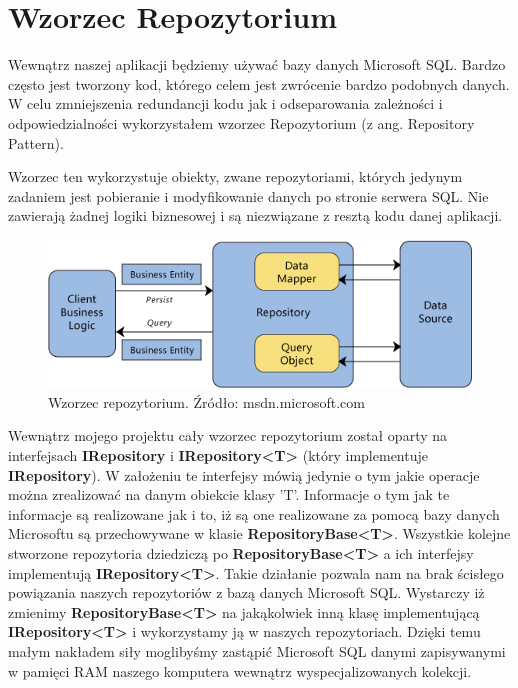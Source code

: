 \section{Wzorzec Repozytorium\cite{RepositoryUnitOfWorkPattern}}

Wewnątrz naszej aplikacji będziemy używać bazy danych Microsoft SQL. Bardzo często jest tworzony kod, którego celem jest zwrócenie bardzo podobnych danych. W celu zmniejszenia redundancji kodu jak i odseparowania zależności i odpowiedzialności wykorzystałem wzorzec Repozytorium (z ang. Repository Pattern).

Wzorzec ten wykorzystuje obiekty, zwane repozytoriami, których jedynym zadaniem jest pobieranie i modyfikowanie danych po stronie serwera SQL. Nie zawierają żadnej logiki biznesowej i są niezwiązane z resztą kodu danej aplikacji. 

\begin{figure}[h]
	\centering
	\includegraphics[width=\textwidth]{images/RepositoryPattern.png}
	 \caption{Wzorzec repozytorium. Źródło: msdn.microsoft.com}
\end{figure}

Wewnątrz mojego projektu cały wzorzec repozytorium został oparty na interfejsach \textbf{IRepository} i \textbf{IRepository<T>} (który implementuje \textbf{IRepository}). W założeniu te interfejsy mówią jedynie o tym jakie operacje można zrealizować na danym obiekcie klasy 'T'. Informacje o tym jak te informacje są realizowane jak i to, iż są one realizowane za pomocą bazy danych Microsoftu są przechowywane w klasie \textbf{RepositoryBase<T>}.
Wszystkie kolejne stworzone repozytoria dziedziczą po \textbf{RepositoryBase<T>} a ich interfejsy implementują \textbf{IRepository<T>}. Takie działanie pozwala nam na brak ścisłego powiązania naszych repozytoriów z bazą danych Microsoft SQL. Wystarczy iż zmienimy \textbf{RepositoryBase<T>} na jakąkolwiek inną klasę implementującą \textbf{IRepository<T>} i wykorzystamy ją w naszych repozytoriach. Dzięki temu małym nakładem siły moglibyśmy zastąpić Microsoft SQL danymi zapisywanymi w pamięci RAM naszego komputera wewnątrz wyspecjalizowanych kolekcji. 


